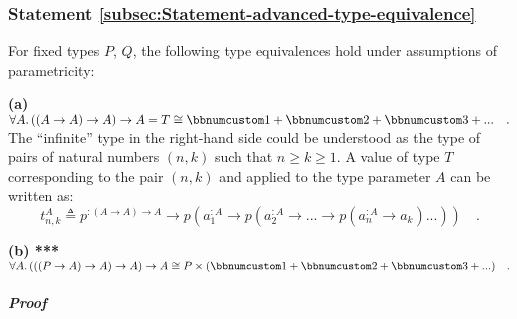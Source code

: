 \subsubsection{Statement \label{subsec:Statement-advanced-type-equivalence}\ref{subsec:Statement-advanced-type-equivalence}}

For fixed types $P$, $Q$, the following type equivalences hold under
assumptions of parametricity:

\textbf{(a)} $\forall A.\,((A\rightarrow A)\rightarrow A)\rightarrow A=T\cong\bbnum 1+\bbnum 2+\bbnum 3+...\quad.$
The \textsf{``}infinite\textsf{''} type in the right-hand side could be understood
as the type of pairs of natural numbers $\left(n,k\right)$ such that
$n\ge k\ge1$. A value of type $T$ corresponding to the pair $\left(n,k\right)$
and applied to the type parameter $A$ can be written as:
\[
t_{n,k}^{A}\triangleq p^{:(A\rightarrow A)\rightarrow A}\rightarrow p(a_{1}^{:A}\rightarrow p(a_{2}^{:A}\rightarrow...\rightarrow p(a_{n}^{:A}\rightarrow a_{k})...))\quad.
\]

\textbf{(b) {*}{*}{*}} $\forall A.\,(((P\rightarrow A)\rightarrow A)\rightarrow A)\rightarrow A\cong P\times(\bbnum 1+\bbnum 2+\bbnum 3+...)\quad.$

\subparagraph{Proof}


